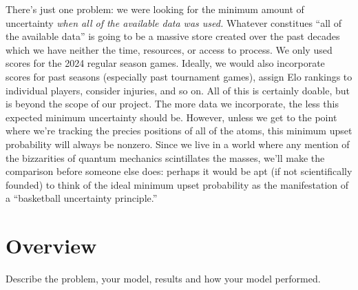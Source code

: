 \documentclass{article}
\begin{document}
There's just one problem: we were looking for the minimum amount of uncertainty \textit{when all of the available data was used.} Whatever constitues \enquote{all of the available data} is going to be a massive store created over the past decades which we have neither the time, resources, or access to process. We only used scores for the 2024 regular season games. Ideally, we would also incorporate scores for past seasons (especially past tournament games), assign Elo rankings to individual players, consider injuries, and so on. All of this is certainly doable, but is beyond the scope of our project. The more data we incorporate, the less this expected minimum uncertainty should be. However, unless we get to the point where we're tracking the precies positions of all of the atoms, this minimum upset probability will always be nonzero. Since we live in a world where any mention of the bizzarities of quantum mechanics scintillates the masses, we'll make the comparison before someone else does: perhaps it would be apt (if not scientifically founded) to think of the ideal minimum upset probability as the manifestation of a \enquote{basketball uncertainty principle.}

\newpage

\section{Overview}
Describe the problem, your model, results and how your model performed.

\newpage
\end{document}
